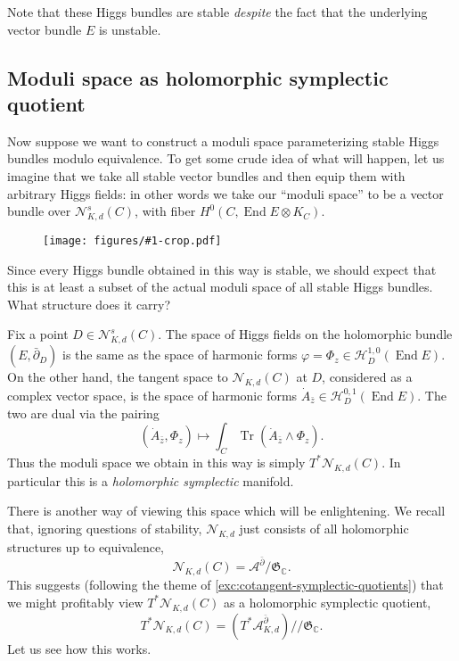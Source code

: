 \documentclass[12pt,letterpaper,reqno]{article}
\numberwithin{equation}{section}
\newcommand{\fG}{{\mathfrak G}}
\newcommand{\cN}{\ensuremath{\mathcal N}}
\newcommand{\cH}{\ensuremath{\mathcal H}}
\newcommand{\cA}{\ensuremath{\mathcal A}}
\newcommand{\C}{\ensuremath{\mathbb C}}
\newcommand{\kq}{/\!\!/}
\newcommand{\ti}[1]{\textit{#1}}
\DeclareMathOperator{\Tr}{Tr}
\DeclareMathOperator{\End}{End}
\newcommand{\insfig}[2]{\begin{figure}[htbp] \centering \texttt{[image: figures/\#1-crop.pdf]} \label{fig:#1} \end{figure}}
\newcommand{\fixme}[1]{{\color{orange}{[#1]}}}
\begin{document}
Note that these Higgs bundles are stable \ti{despite} the fact that the underlying
vector bundle $E$ is unstable.


\subsection{Moduli space as holomorphic symplectic quotient}

Now suppose we want to construct a moduli space parameterizing stable Higgs
bundles modulo equivalence. To get some crude idea of what will happen,
let us imagine that we take all stable vector bundles
and then equip them with arbitrary Higgs fields: in other words
we take our ``moduli space'' to be a vector bundle over 
$\cN^s_{K,d}(C)$, with fiber $H^0(C, \End E \otimes K_C)$.

\insfig{higgs-bundles-16}{1.0}

Since every Higgs bundle obtained in this way is stable, we 
should expect that this is at least a subset of the actual 
moduli space of all stable Higgs bundles.
What structure does it carry?

Fix a point $D \in \cN^s_{K,d}(C)$.
The space of Higgs fields on the holomorphic bundle $(E, \bar\partial_D)$
is the same as the space of harmonic forms
$\varphi = \Phi_z \in \cH^{1,0}_D(\End E)$.
\fixme{need a little more Hodge theory background for this}
On the other hand, the tangent space to $\cN_{K,d}(C)$ at $D$, considered
as a complex vector space, is the space
of harmonic forms $\dot{A}_{\bar z} \in \cH^{0,1}_D(\End E)$.
The two are dual via the pairing
\begin{equation}
  (\dot{A}_{\bar z}, \Phi_z) \mapsto \int_C \Tr (\dot{A}_{\bar z} \wedge \Phi_z).
\end{equation}
Thus the moduli space we obtain in this way is simply $T^* \cN_{K,d}(C)$.
In particular this is a \ti{holomorphic symplectic} manifold.

There is another way of viewing this space which will be enlightening.
We recall that, ignoring questions of stability, $\cN_{K,d}$ just
consists of all holomorphic structures up to equivalence,
\begin{equation}
	\cN_{K,d}(C) = \cA^{\bar\partial} / \fG_\C.
\end{equation}
This suggests 
(following the theme of \autoref{exc:cotangent-symplectic-quotients}) that we might profitably view $T^* \cN_{K,d}(C)$
as a holomorphic symplectic quotient,
\begin{equation}
	T^* \cN_{K,d}(C) = (T^* \cA^{\bar\partial}_{K,d}) \kq \fG_\C.
\end{equation}
Let us see how this works.
\end{document}
